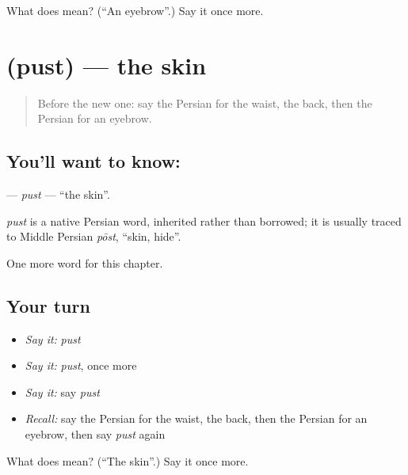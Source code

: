 \begin{tcolorbox}[breakable,colback=teal!4,colframe=teal!35!black,title={Before you move on}]
What does  mean? (\textquotedblleft{}An eyebrow\textquotedblright{}.) Say it once more.
\end{tcolorbox}
\section[\texorpdfstring{\fa{پوست} (pust)}{پوست (pust)}]{ (pust) — the skin}

\label{lesson:FA-C109-pust}



\begin{quote}
Before the new one: say the Persian for the waist, the back, then the Persian for an eyebrow.
\end{quote}

\subsection*{You'll want to know: }
\textbf{} — \emph{pust} — \textquotedblleft{}the skin\textquotedblright{}.

\begin{cousinweb}
\emph{pust} is a native Persian word, inherited rather than borrowed; it is usually traced to Middle Persian \emph{pōst}, \textquotedblleft{}skin, hide\textquotedblright{}.
\end{cousinweb}

\begin{grammarlens}[title={What you've built}]
One more word for this chapter.
\end{grammarlens}

\subsection*{Your turn}
\begin{itemize}
\raggedright
  \item \emph{Say it:} \emph{pust}
  \item \emph{Say it:} \emph{pust}, once more
  \item \emph{Say it:} say \emph{pust}
  \item \emph{Recall:} say the Persian for the waist, the back, then the Persian for an eyebrow, then say \emph{pust} again
\end{itemize}

\begin{tcolorbox}[breakable,colback=teal!4,colframe=teal!35!black,title={Before you move on}]
What does  mean? (\textquotedblleft{}The skin\textquotedblright{}.) Say it once more.
\end{tcolorbox}
